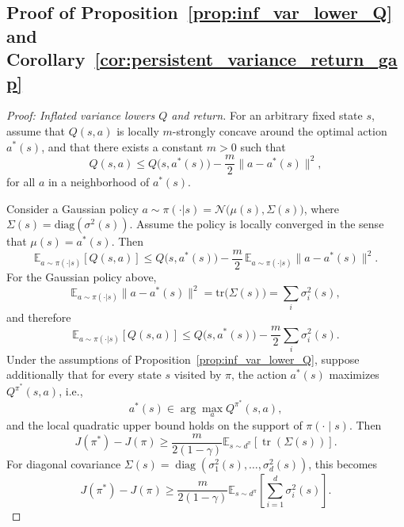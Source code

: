 \subsection{Proof of Proposition~\ref{prop:inf_var_lower_Q} and Corollary~\ref{cor:persistent_variance_return_gap}}
\label{app:proof_inf_var_lower_Q_ret}
\begin{proof}[Proof: Inflated variance lowers $Q$ and return]
    For an arbitrary fixed state $s$, assume that $Q(s,a)$ is locally $m$-strongly concave around the optimal action $a^*(s)$, and that there exists a constant $m>0$ such that
\begin{equation}
    Q(s,a)\le Q\bigl(s,a^*(s)\bigr)-\frac{m}{2}\|a-a^*(s)\|^2,
\end{equation}
for all $a$ in a neighborhood of $a^*(s)$.

Consider a Gaussian policy $a \sim \pi(\cdot|s)=\mathcal{N}\bigl(\mu(s),\Sigma(s)\bigr)$, where $\Sigma(s)=\mathrm{diag}(\sigma^2(s))$. Assume the policy is locally converged in the sense that $\mu(s)=a^*(s)$. Then
\begin{equation}
    \mathbb{E}_{a\sim\pi(\cdot|s)}[Q(s,a)]
    \le
    Q\bigl(s,a^*(s)\bigr)
    -\frac{m}{2}\,
    \mathbb{E}_{a\sim\pi(\cdot|s)}\|a-a^*(s)\|^2.
\end{equation}
For the Gaussian policy above,
\begin{equation}
    \mathbb{E}_{a\sim\pi(\cdot|s)}\|a-a^*(s)\|^2
    = \mathrm{tr}\bigl(\Sigma(s)\bigr)
    = \sum_i \sigma_i^2(s),
\end{equation}
and therefore
\begin{equation}
    \mathbb{E}_{a\sim\pi(\cdot|s)}[Q(s,a)]
    \le
    Q\bigl(s,a^*(s)\bigr)
    -\frac{m}{2}\sum_i \sigma_i^2(s).
\end{equation}
Under the assumptions of Proposition~\ref{prop:inf_var_lower_Q}, suppose additionally that for every state $s$ visited by $\pi$, the action $a^*(s)$ maximizes $Q^{\pi^*}(s,a)$, i.e.,
\begin{equation}
    a^*(s)\in \arg\max_a Q^{\pi^*}(s,a),
\end{equation}
and the local quadratic upper bound holds on the support of $\pi(\cdot\mid s)$. Then
\begin{equation}
    J(\pi^*)-J(\pi)
    \ge
    \frac{m}{2(1-\gamma)}
    \mathbb{E}_{s\sim d^\pi}\!\left[\operatorname{tr}(\Sigma(s))\right].
\end{equation}
For diagonal covariance $\Sigma(s)=\operatorname{diag}(\sigma_1^2(s),\dots,\sigma_d^2(s))$, this becomes
\begin{equation}
    J(\pi^*)-J(\pi)
    \ge
    \frac{m}{2(1-\gamma)}
    \mathbb{E}_{s\sim d^\pi}\!\left[\sum_{i=1}^d \sigma_i^2(s)\right].
\end{equation}
\end{proof}

